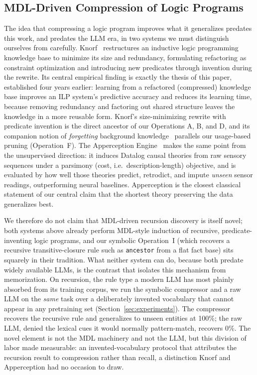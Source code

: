 \documentclass[10pt,conference]{IEEEtran}
\begin{document}
\subsection{MDL-Driven Compression of Logic Programs}
\label{sec:mdl-logic}

The idea that compressing a logic program improves what it generalizes predates this work, and predates the LLM era, in two systems we must distinguish ourselves from carefully. Knorf~\cite{dumancic2021knowledge} restructures an inductive logic programming knowledge base to minimize its size and redundancy, formulating refactoring as constraint optimization and introducing new predicates through invention during the rewrite. Its central empirical finding is exactly the thesis of this paper, established four years earlier: learning from a refactored (compressed) knowledge base improves an ILP system's predictive accuracy and reduces its learning time, because removing redundancy and factoring out shared structure leaves the knowledge in a more reusable form. Knorf's size-minimizing rewrite with predicate invention is the direct ancestor of our Operations A, B, and D, and its companion notion of \emph{forgetting} background knowledge~\cite{cropper2020forgetting} parallels our usage-based pruning (Operation~F). The Apperception Engine~\cite{evans2021making} makes the same point from the unsupervised direction: it induces Datalog causal theories from raw sensory sequences under a parsimony (cost, i.e.\ description-length) objective, and is evaluated by how well those theories predict, retrodict, and impute \emph{unseen} sensor readings, outperforming neural baselines. Apperception is the closest classical statement of our central claim that the shortest theory preserving the data generalizes best.

We therefore do not claim that MDL-driven recursion discovery is itself novel; both systems above already perform MDL-style induction of recursive, predicate-inventing logic programs, and our symbolic Operation~I (which recovers a recursive transitive-closure rule such as \texttt{ancestor} from a flat fact base) sits squarely in their tradition. What neither system can do, because both predate widely available LLMs, is the contrast that isolates this mechanism from memorization. On recursion, the rule type a modern LLM has most plainly absorbed from its training corpus, we run the symbolic compressor and a raw LLM on the \emph{same} task over a deliberately invented vocabulary that cannot appear in any pretraining set (Section~\ref{sec:experiments}). The compressor recovers the recursive rule and generalizes to unseen entities at 100\%; the raw LLM, denied the lexical cues it would normally pattern-match, recovers 0\%. The novel element is not the MDL machinery and not the LLM, but this division of labor made measurable: an invented-vocabulary protocol that attributes the recursion result to compression rather than recall, a distinction Knorf and Apperception had no occasion to draw.
\end{document}
